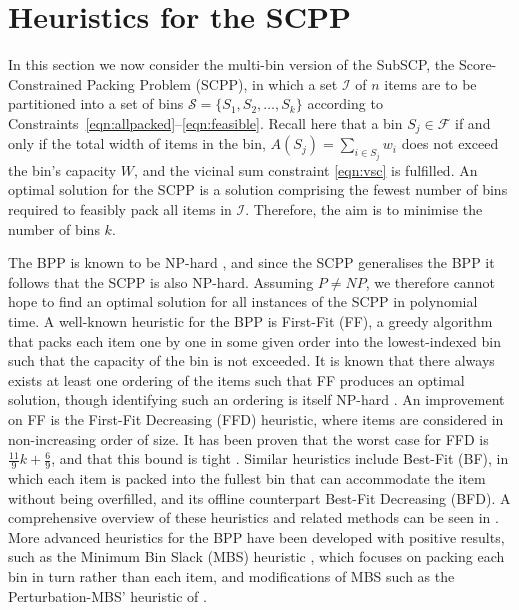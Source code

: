\documentclass[authoryear]{elsarticle}
\begin{document}
\section{Heuristics for the SCPP}
\label{sec:heur}

\noindent In this section we now consider the multi-bin version of the SubSCP, the Score-Constrained Packing Problem (SCPP), in which a set $\mathcal{I}$ of $n$ items are to be partitioned into a set of bins $\mathcal{S} = \{S_1, S_2,\dotsc,S_k\}$ according to Constraints~\eqref{eqn:allpacked}--\eqref{eqn:feasible}. Recall here that a bin $S_j \in \mathcal{F}$ if and only if the total width of items in the bin, $A(S_j) = \sum_{i \in S_j} w_i$ does not exceed the bin's capacity $W$, and the vicinal sum constraint \eqref{eqn:vsc} is fulfilled. An optimal solution for the SCPP is a solution comprising the fewest number of bins required to feasibly pack all items in $\mathcal{I}$. Therefore, the aim is to minimise the number of bins $k$.

The BPP is known to be NP-hard \citep{garey1979}, and since the SCPP generalises the BPP it follows that the SCPP is also NP-hard. Assuming $P \neq NP$, we therefore cannot hope to find an optimal solution for all instances of the SCPP in polynomial time. A well-known heuristic for the BPP is First-Fit (FF), a greedy algorithm that packs each item one by one in some given order into the lowest-indexed bin such that the capacity of the bin is not exceeded. It is known that there always exists at least one ordering of the items such that FF produces an optimal solution, though identifying such an ordering is itself NP-hard  \citep{lewis2009}. An improvement on FF is the First-Fit Decreasing (FFD) heuristic, where items are considered in non-increasing order of size. It has been proven that the worst case for FFD is $\frac{11}{9}k + \frac{6}{9}$, and that this bound is tight \citep{dosa2007}. Similar heuristics include Best-Fit (BF), in which each item is packed into the fullest bin that can accommodate the item without being overfilled, and its offline counterpart Best-Fit Decreasing (BFD). A comprehensive overview of these heuristics and related methods can be seen in \citet{coffman1984}. More advanced heuristics for the BPP have been developed with positive results, such as the Minimum Bin Slack (MBS) heuristic \citep{gupta1999}, which focuses on packing each bin in turn rather than each item, and modifications of MBS such as the Perturbation-MBS' heuristic of \citet{fleszar2002}. 
\end{document}
